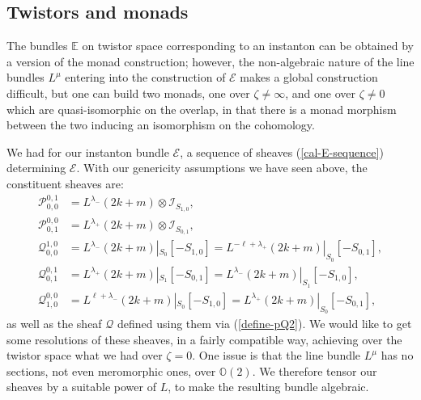 \documentclass[12pt]{article}
\theoremstyle{definition}
\theoremstyle{remark}
\numberwithin{theorem}{section}
\def\bE{{\mathbb {E}}}
\def\bO{{\mathbb {O}}}
\def\pE{{\mathcal E}}
\def\pI{{\mathcal I}}
\def\pP{{\mathcal P}}
\def\pQ{{\mathcal Q}}
\begin{document}
 
 \subsection{Twistors and monads} 
 
 The bundles $\bE$ on twistor space corresponding to an instanton can be obtained by a version of the monad construction; however, the non-algebraic nature of the line bundles $L^\mu$ entering into the construction of $\pE$ makes a global construction difficult, but one can build two monads, one over $\zeta\neq \infty$, and one over $\zeta\neq 0$ which are quasi-isomorphic on the overlap, in that there is a monad morphism between the two inducing an isomorphism on the cohomology. 
 
 We had for our instanton bundle $\pE$, a sequence of sheaves (\ref{cal-E-sequence}) determining $\pE$. With our genericity assumptions we have seen above, the constituent sheaves are:
  \begin{align}\pP_{0,0}^{0 ,1} &= L^{ \lambda_-}(2k+m)\otimes \pI_{S_{1,0}},\\
\pP_{0 ,1}^{0 ,0}&=  L^{ \lambda_+}(2k+m)\otimes \pI_{S_{0,1}},\\
\pQ_{0,0}^{ 1 ,0}  &= L^{  \lambda_-}(2k+m)|_{S_0}[-S_{1,0}] =  L^{ -\ell +\lambda_+}(2k+m)|_{S_0}[-S_{0,1}],\\
\pQ_{0,1}^{0 ,1}&=   L^{ \lambda_+}(2k+m)|_{S_1}[-S_{0,1}]  =  L^{\lambda_-}(2k+m)|_{S_1}[-S_{1,0}],\\
\pQ_{1,0}^{0 ,0}  &= L^{ \ell + \lambda_-}(2k+m)|_{S_0}[-S_{1,0}] =  L^{ \lambda_+}(2k+m)|_{S_0}[-S_{0,1}],
 \end{align}
as well as the sheaf $\pQ$ defined using them via (\ref{define-pQ2}).
 We would like to get some resolutions of these sheaves, in a fairly compatible way, achieving over the twistor space what we had over $\zeta = 0$.  One issue is that the line bundle $L^\mu$ has no sections, not even meromorphic ones, over $\bO(2)$. We therefore  tensor our sheaves by a suitable power of $L$, to make the resulting bundle algebraic.
 
\end{document}
